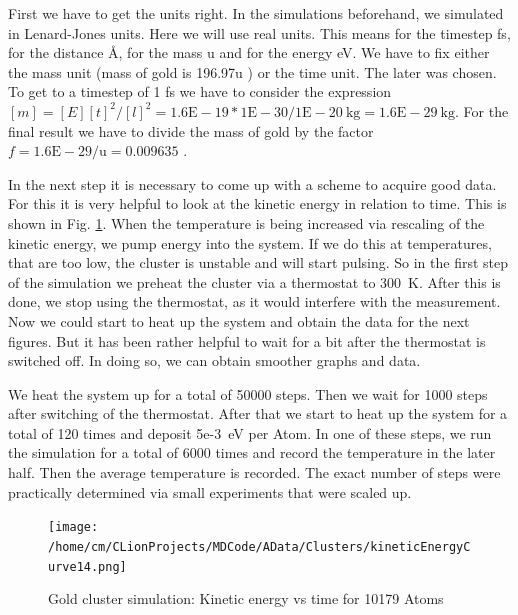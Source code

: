 \par 
First we have to get the units right. In the simulations beforehand, we simulated in Lenard-Jones units. 
Here we will use real units. 
This means for the timestep fs, for the distance \r{A}, for the mass u and for the energy eV. 
We have to fix either the mass unit (mass of gold is 196.97u \cite{Kurzweil2015}) or the time unit. 
The later was chosen. To get to a timestep of 1 fs we have to consider the expression $ [m] = [E][t]^2/[l]^2 = 1.6\mathrm{E}-19 * 1\mathrm{E}-30/1\mathrm{E}-20~\mathrm{kg} = 1.6\mathrm{E}-29~\mathrm{kg} $. For the final result we have to divide the mass of gold by the factor $ f = 1.6\mathrm{E}-29/\mathrm{u} = 0.009635 $
\cite{molDymCourse}.

In the next step it is necessary to come up with a scheme to acquire good data.
For this it is very helpful to look at the kinetic energy in relation to time. 
This is shown in Fig. \ref{GoldClusterSimulationKinVsTime}. 
When the temperature is being increased via rescaling of the kinetic energy, we pump energy into the system. 
If we do this at temperatures, that are too low, the cluster is unstable and will start pulsing. 
So in the first step of the simulation we preheat the cluster via a thermostat to 300~K. 
After this is done, we stop using the thermostat, as it would interfere with the measurement. 
Now we could start to heat up the system and obtain the data for the next figures. But it has been rather helpful to wait for a bit after the thermostat is switched off. In doing so, we can obtain smoother graphs and data. 
\par
We heat the system up for a total of 50000 steps. Then we wait for 1000 steps after switching of the thermostat. 
After that we start to heat up the system for a total of 120 times and deposit 5e-3~eV per Atom. 
In one of these steps, we run the simulation for a total of 6000 times and record the temperature in the later half. 
Then the average temperature is recorded. 
The exact number of steps were practically determined via small experiments that were scaled up. 
\begin{figure}
	\begin{center} 
		\texttt{[image: /home/cm/CLionProjects/MDCode/AData/Clusters/kineticEnergyCurve14.png]} 
	\end{center} 
	\caption[Gold cluster simulation: Kinetic Energy vs Time]{Gold cluster simulation: Kinetic energy vs time for 10179 Atoms} 
	\label{GoldClusterSimulationKinVsTime} 
\end{figure} 


